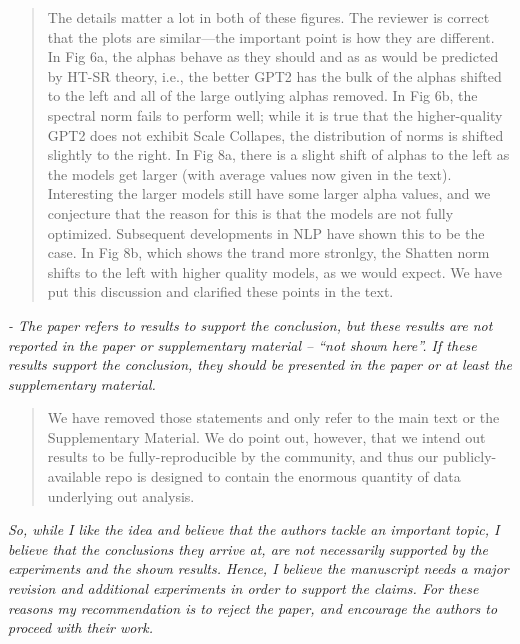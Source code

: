 \documentclass[11pt]{article}
\begin{document}
\begin{quote}
The details matter a lot in both of these figures.
The reviewer is correct that the plots are similar---the important point is how they are different.
In Fig 6a, the alphas behave as they should and as as would be predicted by HT-SR theory, i.e., the better GPT2 has the bulk of the alphas shifted to the left and all of the large outlying alphas removed. 
In Fig 6b, the spectral norm fails to perform well; while it is true that the higher-quality GPT2 does not exhibit Scale Collapes, the distribution of norms is shifted slightly to the right.
In Fig 8a, there is a slight shift of alphas to the left as the models get larger (with average values now given 
in the text).
Interesting the larger models still have some larger alpha values, and we conjecture 
that the reason for this is that the models are not fully optimized.  
Subsequent developments in NLP have shown this to be the case.
In Fig 8b, which shows the trand more stronlgy, the Shatten norm shifts to the left with higher quality models, as we would expect.
We have put this discussion and clarified these points in the text.

\end{quote}

\noindent
\emph{%
- The paper refers to results to support the conclusion, but these results are not reported in the paper or supplementary material -- ``not shown here''. If these results support the conclusion, they should be presented in the paper or at least the supplementary material.
}

\begin{quote}
We have removed those statements and only refer to the main text or the Supplementary Material.
We do point out, however, that we intend out results to be fully-reproducible by the community, and thus our publicly-available repo is designed to contain the enormous quantity of data underlying out analysis.
\end{quote}

\noindent
\emph{%
So, while I like the idea and believe that the authors tackle an important topic, I believe that the conclusions they arrive at, are not necessarily supported by the experiments and the shown results. Hence, I believe the manuscript needs a major revision and additional experiments in order to support the claims. For these reasons my recommendation is to reject the paper, and encourage the authors to proceed with their work.
}
\end{document}
